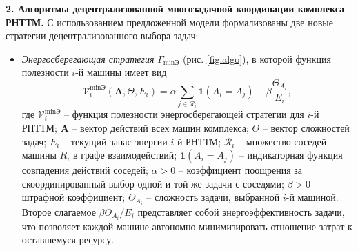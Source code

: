 \textbf{2. Алгоритмы децентрализованной многозадачной координации комплекса РНТТМ.} С использованием предложенной модели формализованы две новые стратегии децентрализованного выбора задач:
\begin{itemize}[beginpenalty=10000, midpenalty=10000, wide=\parindent, leftmargin=0pt]
    \item \textit{Энергосберегающая стратегия} $ \Gamma_{\min\text{Э}} $ (рис. \ref{fig:algo}), в которой функция полезности $ i $-й машины имеет вид
    \begin{equation}
        \mathcal{V}_i^{\min\text{Э}}(\mathbf{A}, \Theta, E_i) = \alpha \sum_{j \in \mathcal{R}_i}
        \mathbf{1}(A_i = A_j) - \beta \frac{\Theta_{A_i}}{E_i},
    \end{equation}
    где $\mathcal{V}_i^{\min\text{Э}}$ -- функция полезности энергосберегающей стратегии для $i$-й РНТТМ; $\mathbf{A}$ -- вектор действий всех машин комплекса; $\Theta$ -- вектор сложностей задач; $E_i$ -- текущий запас энергии $i$-й РНТТМ; $\mathcal{R}_i$ -- множество соседей машины $R_i$ в графе взаимодействий; $\mathbf{1}(A_i = A_j)$ -- индикаторная функция совпадения действий соседей; $\alpha > 0$ -- коэффициент поощрения за скоординированный выбор одной и той же задачи с соседями; $\beta > 0$ -- штрафной коэффициент; $\Theta_{A_i}$ -- сложность задачи, выбранной $ i $-й машиной. Второе слагаемое $ \beta \Theta_{A_i}/E_i $ представляет собой энергоэффективность задачи, что позволяет каждой машине автономно минимизировать отношение затрат к оставшемуся ресурсу.


\end{itemize}
